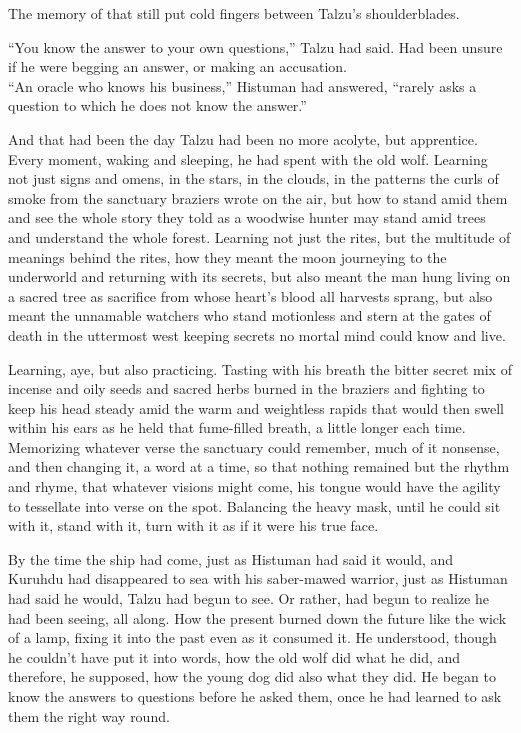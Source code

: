 The memory of that still put cold fingers between Talzu's shoulderblades.

``You know the answer to your own questions,'' Talzu had said. Had been unsure if he were begging an answer, or making an accusation.\\
``An oracle who knows his business,'' Histuman had answered, ``rarely asks a question to which he does not know the answer.''

And that had been the day Talzu had been no more acolyte, but apprentice. Every moment, waking and sleeping, he had spent with the old wolf. Learning not just signs and omens, in the stars, in the clouds, in the patterns the curls of smoke from the sanctuary braziers wrote on the air, but how to stand amid them and see the whole story they told as a woodwise hunter may stand amid trees and understand the whole forest. Learning not just the rites, but the multitude of meanings behind the rites, how they meant the moon journeying to the underworld and returning with its secrets, but also meant the man hung living on a sacred tree as sacrifice from whose heart's blood all harvests sprang, but also meant the unnamable watchers who stand motionless and stern at the gates of death in the uttermost west keeping secrets no mortal mind could know and live.

Learning, aye, but also practicing. Tasting with his breath the bitter secret mix of incense and oily seeds and sacred herbs burned in the braziers and fighting to keep his head steady amid the warm and weightless rapids that would then swell within his ears as he held that fume-filled breath, a little longer each time. Memorizing whatever verse the sanctuary could remember, much of it nonsense, and then changing it, a word at a time, so that nothing remained but the rhythm and rhyme, that whatever visions might come, his tongue would have the agility to tessellate into verse on the spot. Balancing the heavy mask, until he could sit with it, stand with it, turn with it as if it were his true face.

By the time the ship had come, just as Histuman had said it would, and Kuruhdu had disappeared to sea with his saber-mawed warrior, just as Histuman had said he would, Talzu had begun to see. Or rather, had begun to realize he had been seeing, all along. How the present burned down the future like the wick of a lamp, fixing it into the past even as it consumed it. He understood, though he couldn't have put it into words, how the old wolf did what he did, and therefore, he supposed, how the young dog did also what they did. He began to know the answers to questions before he asked them, once he had learned to ask them the right way round.

